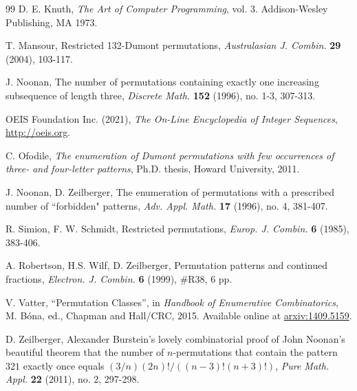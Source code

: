 \documentclass[
final
]{dmtcs-episciences}
\theoremstyle{definition}
\theoremstyle{remark}
\begin{document}
{\begin{thebibliography}{99}
 D. E. Knuth, \emph{The Art of Computer Programming}, vol. 3. Addison-Wesley Publishing, MA 1973.


 T. Mansour, Restricted 132-Dumont permutations, \emph{Australasian J. Combin.} \textbf{29} (2004), 103-117.



 J. Noonan, The number of permutations containing exactly one increasing subsequence of length three, \emph{Discrete Math.} \textbf{152} (1996), no. 1-3, 307-313.

 OEIS Foundation Inc. (2021), \emph{The On-Line Encyclopedia of Integer Sequences}, \href{http://oeis.org}{http://oeis.org}.

 C. Ofodile, \emph{The enumeration of Dumont permutations with few occurrences of three- and four-letter patterns}, Ph.D. thesis, Howard University, 2011.

 J. Noonan, D. Zeilberger, The enumeration of permutations with a prescribed number of ``forbidden" patterns, \emph{Adv. Appl. Math.} \textbf{17} (1996), no. 4, 381-407.

 R. Simion, F. W. Schmidt, Restricted permutations,  \emph{Europ. J. Combin.} \textbf {6} (1985), 383-406.



 A. Robertson, H.S. Wilf, D. Zeilberger, Permutation patterns and continued fractions, \emph{Electron. J. Combin.} \textbf{6} (1999), \#R38, 6 pp.

 V. Vatter, ``Permutation Classes'', in \emph{Handbook of Enumerative Combinatorics}, M. B\'ona, ed., Chapman and Hall/CRC, 2015. Available online at \href{https://arxiv.org/abs/1409.5159}{arxiv:1409.5159}.


 D. Zeilberger, Alexander Burstein's lovely combinatorial proof of John Noonan's beautiful theorem that the number of $n$-permutations that contain the pattern $321$ exactly once equals $(3/n)(2n)!/((n-3)!(n+3)!)$, \emph{Pure Math. Appl.} \textbf{22} (2011), no. 2, 297-298.

\end{thebibliography}

}
\end{document}
